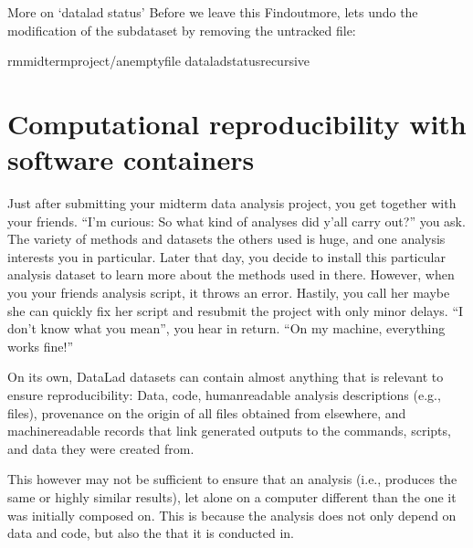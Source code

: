 \begin{findoutmore}[label={fom-status}, before title={\thetcbcounter\ }, float, check odd page=true]{More on ‘datalad status’}
\sphinxAtStartPar
Before we leave this Find\sphinxhyphen{}out\sphinxhyphen{}more, lets undo the modification of the subdataset
by removing the untracked file:

\begin{sphinxVerbatim}[commandchars=\\\{\}]
rmmidterm\PYGZus{}project/an\PYGZus{}empty\PYGZus{}file
dataladstatus\PYGZhy{}\PYGZhy{}recursive
\end{sphinxVerbatim}


\end{findoutmore}

\sphinxstepscope


\section{Computational reproducibility with software containers}
\label{\detokenize{basics/101-133-containersrun:computational-reproducibility-with-software-containers}}\label{\detokenize{basics/101-133-containersrun:containersrun}}\label{\detokenize{basics/101-133-containersrun::doc}}
\sphinxAtStartPar
Just after submitting your midterm data analysis project, you get together
with your friends. “I’m curious: So what kind of analyses did y’all carry out?”
you ask. The variety of methods and datasets the others used is huge, and
one analysis interests you in particular. Later that day, you decide to
install this particular analysis dataset to learn more about the methods used
in there. However, when you  your friends analysis script,
it throws an error. Hastily, you call her \textendash{} maybe she can quickly fix her
script and resubmit the project with only minor delays. “I don’t know what
you mean”, you hear in return.
“On my machine, everything works fine!”

\sphinxAtStartPar
On its own, DataLad datasets can contain almost anything that is relevant to
ensure reproducibility: Data, code, human\sphinxhyphen{}readable analysis descriptions
(e.g.,  files), provenance on the origin of all files
obtained from elsewhere, and machine\sphinxhyphen{}readable records that link generated
outputs to the commands, scripts, and data they were created from.

\sphinxAtStartPar
This however may not be sufficient to ensure that an analysis 
(i.e., produces the same or highly similar results), let alone  on a
computer different than the one it was initially composed on. This is because
the analysis does not only depend on data and code, but also the
 that it is conducted in.

